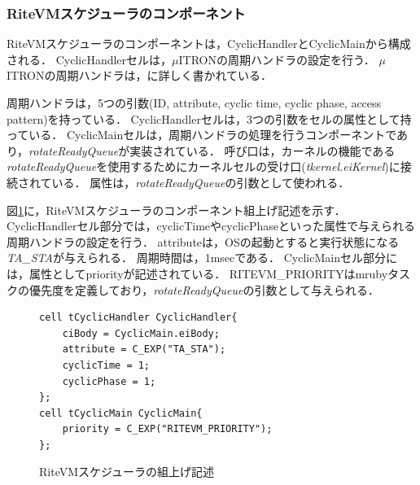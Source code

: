 \documentclass[submit,techrep]{ipsj}
\begin{document}
\subsubsection{RiteVMスケジューラのコンポーネント}
RiteVMスケジューラのコンポーネントは，CyclicHandlerとCyclicMainから構成される．
CyclicHandlerセルは，$\mu$ITRONの周期ハンドラの設定を行う．
$\mu$ITRONの周期ハンドラは，\cite{par:microITRON}に詳しく書かれている．

周期ハンドラは，5つの引数(ID, attribute, cyclic time, cyclic phase, access pattern)を持っている．
CyclicHandlerセルは，3つの引数をセルの属性として持っている．
CyclicMainセルは，周期ハンドラの処理を行うコンポーネントであり，{\it rotateReadyQueue}が実装されている．
呼び口は，カーネルの機能である{\it rotateReadyQueue}を使用するためにカーネルセルの受け口({\it tkernel.eiKernel})に接続されている．
属性は，{\it rotateReadyQueue}の引数として使われる．

図\ref{build_cyclic_handler}に，RiteVMスケジューラのコンポーネント組上げ記述を示す．
CyclicHandlerセル部分では，cyclicTimeやcyclicPhaseといった属性で与えられる周期ハンドラの設定を行う．
attributeは，OSの起動とすると実行状態になる{\it TA\_STA}が与えられる．
周期時間は，1msecである．
CyclicMainセル部分には，属性としてpriorityが記述されている．
RITEVM\_PRIORITYはmrubyタスクの優先度を定義しており，{\it rotateReadyQueue}の引数として与えられる．

\begin{figure}[t]
    \centering
    \begin{lstlisting}
cell tCyclicHandler CyclicHandler{
    ciBody = CyclicMain.eiBody;
    attribute = C_EXP("TA_STA");
    cyclicTime = 1;
    cyclicPhase = 1;
};
cell tCyclicMain CyclicMain{
    priority = C_EXP("RITEVM_PRIORITY");
};
   \end{lstlisting}
    \caption{RiteVMスケジューラの組上げ記述}
\vspace{-2mm}
    \label{build_cyclic_handler}
\end{figure}
 
\end{document}
